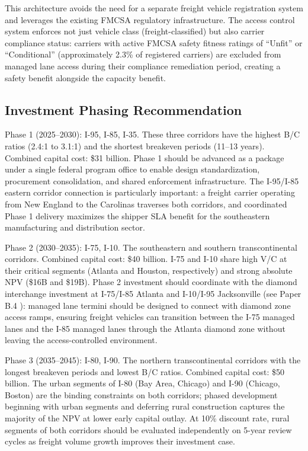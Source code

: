 This architecture avoids the need for a separate freight vehicle registration system and leverages the existing FMCSA regulatory infrastructure. The access control system enforces not just vehicle class (freight-classified) but also carrier compliance status: carriers with active FMCSA safety fitness ratings of ``Unfit'' or ``Conditional'' (approximately 2.3\% of registered carriers) are excluded from managed lane access during their compliance remediation period, creating a safety benefit alongside the capacity benefit.

\subsection{Investment Phasing Recommendation}

Phase 1 (2025--2030): I-95, I-85, I-35. These three corridors have the highest B/C ratios (2.4:1 to 3.1:1) and the shortest breakeven periods (11--13 years). Combined capital cost: \$31 billion. Phase 1 should be advanced as a package under a single federal program office to enable design standardization, procurement consolidation, and shared enforcement infrastructure. The I-95/I-85 eastern corridor connection is particularly important: a freight carrier operating from New England to the Carolinas traverses both corridors, and coordinated Phase 1 delivery maximizes the shipper SLA benefit for the southeastern manufacturing and distribution sector.

Phase 2 (2030--2035): I-75, I-10. The southeastern and southern transcontinental corridors. Combined capital cost: \$40 billion. I-75 and I-10 share high V/C at their critical segments (Atlanta and Houston, respectively) and strong absolute NPV (\$16B and \$19B). Phase 2 investment should coordinate with the diamond interchange investment at I-75/I-85 Atlanta and I-10/I-95 Jacksonville (see Paper B.4 \citep{ROUTE_B4}): managed lane termini should be designed to connect with diamond zone access ramps, ensuring freight vehicles can transition between the I-75 managed lanes and the I-85 managed lanes through the Atlanta diamond zone without leaving the access-controlled environment.

Phase 3 (2035--2045): I-80, I-90. The northern transcontinental corridors with the longest breakeven periods and lowest B/C ratios. Combined capital cost: \$50 billion. The urban segments of I-80 (Bay Area, Chicago) and I-90 (Chicago, Boston) are the binding constraints on both corridors; phased development beginning with urban segments and deferring rural construction captures the majority of the NPV at lower early capital outlay. At 10\% discount rate, rural segments of both corridors should be evaluated independently on 5-year review cycles as freight volume growth improves their investment case.

